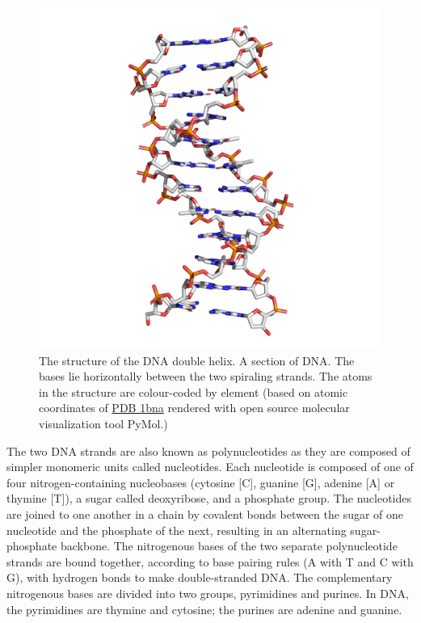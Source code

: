 \begin{figure}

{\centering \includegraphics[width=0.7\linewidth]{./figures/dna/dna_licorice} 

}

\caption{The structure of the DNA double helix. A section of DNA. The bases lie horizontally between the two spiraling strands. The atoms in the structure are colour-coded by element (based on atomic coordinates of \href{https://www.rcsb.org/structure/1bna}{PDB 1bna} rendered with open source molecular visualization tool PyMol.)}\label{fig:dnastructure}
\end{figure}

The two DNA strands are also known as polynucleotides as they are composed of simpler monomeric units called nucleotides. Each nucleotide is composed of one of four nitrogen-containing nucleobases (cytosine {[}C{]}, guanine {[}G{]}, adenine {[}A{]} or thymine {[}T{]}), a sugar called deoxyribose, and a phosphate group. The nucleotides are joined to one another in a chain by covalent bonds between the sugar of one nucleotide and the phosphate of the next, resulting in an alternating sugar-phosphate backbone. The nitrogenous bases of the two separate polynucleotide strands are bound together, according to base pairing rules (A with T and C with G), with hydrogen bonds to make double-stranded DNA. The complementary nitrogenous bases are divided into two groups, pyrimidines and purines. In DNA, the pyrimidines are thymine and cytosine; the purines are adenine and guanine.



